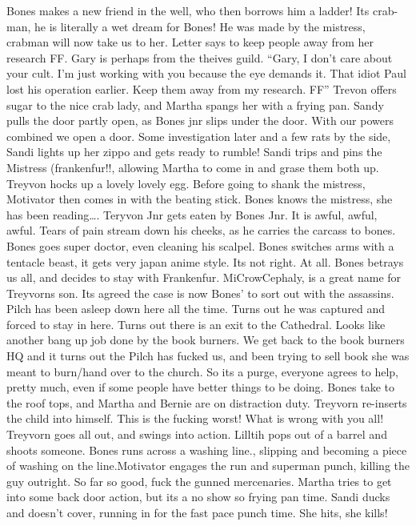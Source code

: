 Bones makes a new friend in the well, who then borrows him a ladder! Its crab-man, he is literally a wet dream for Bones! He was made by the mistress, crabman will now take us to her.\medskip
Letter says to keep people away from her research FF. Gary is perhaps from the theives guild.\medskip
“Gary, I don't care about your cult. I'm just working with you because the eye demands it. That idiot Paul lost his operation earlier. Keep them away from my research. FF” Trevon offers sugar to the nice crab lady, and Martha spangs her with a frying pan.\medskip
Sandy pulls the door partly open, as Bones jnr slips under the door. With our powers combined we open a door.\medskip
Some investigation later and a few rats by the side, Sandi lights up her zippo and gets ready to rumble!\medskip
Sandi trips and pins the Mistress (frankenfur!!, allowing Martha to come in and grase them both up.\medskip
Treyvon hocks up a lovely lovely egg. Before going to shank the mistress, Motivator then comes in with the beating stick.\medskip
Bones knows the mistress, she has been reading….\medskip
Teryvon Jnr gets eaten by Bones Jnr. It is awful, awful, awful. Tears of pain stream down his cheeks, as he carries the carcass to bones. Bones goes super doctor, even cleaning his scalpel.\medskip
Bones switches arms with a tentacle beast, it gets very japan anime style. Its not right. At all.\medskip
Bones betrays us all, and decides to stay with Frankenfur.\medskip
MiCrowCephaly, is a great name for Treyvorns son.\medskip
Its agreed the case is now Bones’ to sort out with the assassins.\medskip
Pilch has been asleep down here all the time. Turns out he was captured and forced to stay in here.\medskip
Turns out there is an exit to the Cathedral. Looks like another bang up job done by the book burners.\medskip
We get back to the book burners HQ and it turns out the Pilch has fucked us, and been trying to sell book she was meant to burn/hand over to the church. So its a purge, everyone agrees to help, pretty much, even if some people have better things to be doing.\medskip
Bones take to the roof tops, and Martha and Bernie are on distraction duty. Treyvorn re-inserts the child into himself. This is the fucking worst! What is wrong with you all!\medskip
Treyvorn goes all out, and swings into action. Lilltih pops out of a barrel and shoots someone. Bones runs across a washing line., slipping and becoming a piece of washing on the line.Motivator engages the run and superman punch, killing the guy outright. So far so good, fuck the gunned mercenaries. Martha tries to get into some back door action, but its a no show so frying pan time. Sandi ducks and doesn’t cover, running in for the fast pace punch time. She hits, she kills!\medskip
